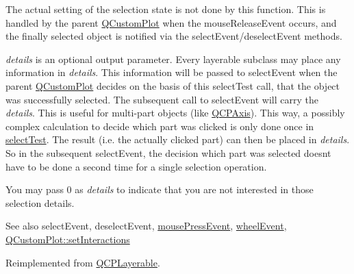 The actual setting of the selection state is not done by this function. This is handled by the parent \mbox{\hyperlink{class_q_custom_plot}{Q\+Custom\+Plot}} when the mouse\+Release\+Event occurs, and the finally selected object is notified via the select\+Event/deselect\+Event methods.

{\itshape details} is an optional output parameter. Every layerable subclass may place any information in {\itshape details}. This information will be passed to select\+Event when the parent \mbox{\hyperlink{class_q_custom_plot}{Q\+Custom\+Plot}} decides on the basis of this select\+Test call, that the object was successfully selected. The subsequent call to select\+Event will carry the {\itshape details}. This is useful for multi-\/part objects (like \mbox{\hyperlink{class_q_c_p_axis}{Q\+C\+P\+Axis}}). This way, a possibly complex calculation to decide which part was clicked is only done once in \mbox{\hyperlink{class_q_c_p_abstract_plottable_a38efe9641d972992a3d44204bc80ec1d}{select\+Test}}. The result (i.\+e. the actually clicked part) can then be placed in {\itshape details}. So in the subsequent select\+Event, the decision which part was selected doesn\textquotesingle{}t have to be done a second time for a single selection operation.

You may pass 0 as {\itshape details} to indicate that you are not interested in those selection details.

\begin{DoxySeeAlso}{See also}
select\+Event, deselect\+Event, \mbox{\hyperlink{class_q_c_p_layerable_af6567604818db90f4fd52822f8bc8376}{mouse\+Press\+Event}}, \mbox{\hyperlink{class_q_c_p_layerable_a47dfd7b8fd99c08ca54e09c362b6f022}{wheel\+Event}}, \mbox{\hyperlink{class_q_custom_plot_a5ee1e2f6ae27419deca53e75907c27e5}{Q\+Custom\+Plot\+::set\+Interactions}} 
\end{DoxySeeAlso}


Reimplemented from \mbox{\hyperlink{class_q_c_p_layerable_a04db8351fefd44cfdb77958e75c6288e}{Q\+C\+P\+Layerable}}.



